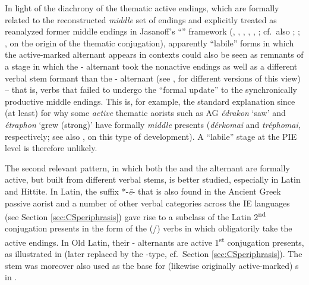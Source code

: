 \documentclass[output=paper,colorlinks,citecolor=brown]{langscibook}
\begin{document}
In light of the diachrony of the thematic active endings,  which are formally related to the reconstructed \emph{middle} set of endings and explicitly treated as reanalyzed former middle endings in Jasanoff's ``'' framework (\citealt{Jasanoff1978}, \citeyear{Jasanoff2003}, \citeyear{Jasanoff2004}, \citeyear{Jasanoff2017}, \citeyear{Jasanoff2019}, \citeyear{Jasanoff2023}; cf.\ also \citealt{Watkins1969}; \citealt{Hollifield1977}; \citealt{Villanueva2003}, \citeyear{VillanuevaSvensson2021} on the origin of the thematic conjugation), apparently ``labile'' forms in which the active-marked alternant appears in  contexts  could also be seen as remnants of a stage in which the - alternant took the nonactive endings as well as a different verbal stem formant than the - alternant (see \citealt{Meiser1993}, \citealt{Luraghi2012} for different versions of this view) -- that is, verbs that failed to undergo the ``formal update'' to the synchronically productive middle endings. This is, for example, the standard explanation since (at least) \citealt{Watkins1969} for why some \emph{active} thematic aorists such as AG \textit{édrakon} `saw' and \textit{étraphon} `grew (strong)' have  formally \emph{middle} presents (\textit{dérkomai} and \textit{tréphomai}, respectively; see also \citealt{Rau2013}, \citeyear{Rau2016} on this type of development). A ``labile'' stage at the PIE level is therefore unlikely. 

The second relevant pattern, in which both the  and the  alternant are formally active, but built from different verbal stems, is better studied, especially in Latin and Hittite. In Latin, the suffix *-\textit{ē}- that is also found in the Ancient Greek passive aorist and a number of other verbal categories across the IE languages (see Section \ref{sec:CSperiphrasis}) gave rise to a subclass of the Latin 2\textsuperscript{nd} conjugation presents in the form of the (/) verbs in   which obligatorily take the active endings. In Old Latin, their - alternants are active  1\textsuperscript{st} conjugation presents, as illustrated in  (later replaced by the -type, cf.\ Section \ref{sec:CSperiphrasis}). The stem was moreover also used as the base for (likewise originally active-marked) s in .
\end{document}
